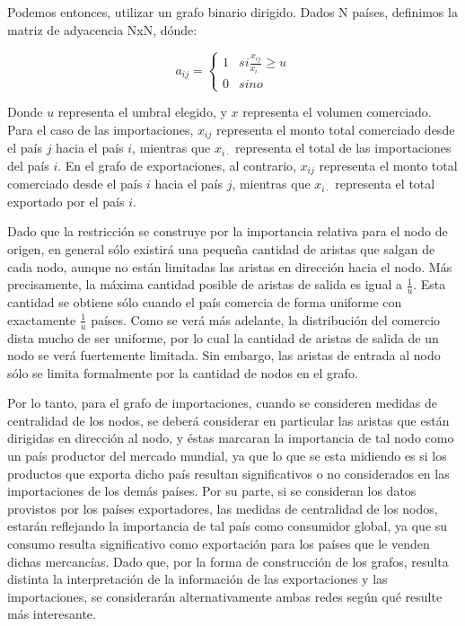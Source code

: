 \documentclass[class=article, crop=false]{standalone}
\begin{document}
Podemos entonces, utilizar un grafo binario dirigido. Dados N países, definimos la matriz de adyacencia NxN, dónde:

$$
a_{ij} = 
 \begin{cases} 
      1 & si \frac{x_{ij}}{x_{i\cdot}}\geq u \\
      0 & sino 
  \end{cases}
$$

Donde $u$ representa el umbral elegido, y $x$ representa el volumen comerciado.   
Para el caso de las importaciones, $x_{ij}$ representa el monto total comerciado desde el país $j$ hacia el país $i$, mientras que $x_{i\cdot}$ representa el total de las importaciones del país $i$. En el grafo de exportaciones, al contrario, $x_{ij}$ representa el monto total comerciado desde el país $i$ hacia el país $j$, mientras que $x_{i\cdot}$ representa el total exportado por el país $i$.          

Dado que la restricción se construye por la importancia relativa para el nodo de origen, en general sólo existirá una pequeña cantidad de aristas que salgan de cada nodo, aunque no están limitadas las aristas en dirección hacia el nodo. Más precisamente, la máxima cantidad posible de aristas de salida es igual a $\frac{1}{u}$. Esta cantidad se obtiene sólo cuando el país comercia de forma uniforme con exactamente $\frac{1}{u}$ países. Como se verá más adelante, la distribución del comercio dista mucho de ser uniforme, por lo cual la cantidad de aristas de salida de un nodo se verá fuertemente limitada. Sin embargo, las aristas de entrada al nodo sólo se limita formalmente por la cantidad de nodos en el grafo. 

Por lo tanto, para el grafo de importaciones, cuando se consideren medidas de centralidad de los nodos, se deberá considerar en particular las aristas que están dirigidas en dirección al nodo, y éstas marcaran la importancia de tal nodo como un país productor del mercado mundial, ya que lo que se esta midiendo es si los productos que exporta dicho país resultan significativos o no considerados en las importaciones de los demás países. Por su parte, si se consideran los datos provistos por los países exportadores, las medidas de centralidad de los nodos, estarán reflejando la importancia de tal país como consumidor global, ya que su consumo resulta significativo como exportación para los países que le venden dichas mercancías. 
Dado que, por la forma de construcción de los grafos, resulta distinta la interpretación de la información de las exportaciones y las importaciones, se considerarán alternativamente ambas redes según qué resulte más interesante. 
\end{document}
